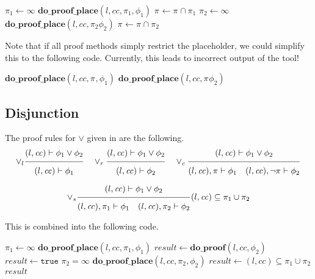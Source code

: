 \documentclass{article}
\newcommand{\proofrule}[3][]{#1 \frac{\raisebox{.7ex}{\normalsize{$#2$}}}
  {\raisebox{-1.0ex}{\normalsize{$#3$}}}}
\newcommand{\placeholder}[1][]{\pi_{#1}}
\newcommand{\loc}{l}
\newcommand{\region}{\mathit{cc}}
\newcommand{\var}[1]{\ensuremath{\mathit{#1}}}
\newcommand{\method}[1]{\ensuremath{\mathbf{#1}}}
\newcommand{\true}{\texttt{true}}
\begin{document}
\begin{algorithm}[H]
\caption{$\method{do\_proof\_place\_and}(\loc, \region, \placeholder, \phi_1 \land \phi_2)$}
\begin{algorithmic}
\STATE $\placeholder[1] \gets \infty$
\STATE $\method{do\_proof\_place}(\loc, \region, \placeholder[1], \phi_1)$
\STATE $\placeholder \gets \placeholder \cap \placeholder[1]$
\IF{$\placeholder = \emptyset$}
  \STATE $\placeholder[2] \gets \infty$
  \STATE $\method{do\_proof\_place}(\loc, \region, \placeholder[2] \phi_2)$
  \STATE $\placeholder \gets \placeholder \cap \placeholder[2]$
\ENDIF
\end{algorithmic}
\end{algorithm}
Note that if all proof methods simply restrict the placeholder, we could simplify this to the following code.
Currently, this leads to incorrect output of the tool!
\begin{algorithm}[H]
\caption{$\method{do\_proof\_place\_and}(\loc, \region, \placeholder, \phi_1 \land \phi_2)$}
\begin{algorithmic}
\STATE $\method{do\_proof\_place}(\loc, \region, \placeholder, \phi_1)$
\IF{$\placeholder = \emptyset$}
  \STATE $\method{do\_proof\_place}(\loc, \region, \placeholder \phi_2)$
\ENDIF
\end{algorithmic}
\end{algorithm}

\subsection{Disjunction}
The proof rules for $\lor$ given in \cite{FC:14} are the following.
\[
\proofrule[\lor_l]
{(\loc, \region) \vdash \phi_1 \lor \phi_2}
{(\loc, \region) \vdash \phi_1}
%
\quad
\proofrule[\lor_r]
{(\loc, \region) \vdash \phi_1 \lor \phi_2}
{(\loc, \region) \vdash \phi_2}
\quad
\proofrule[\lor_c]
{(\loc, \region) \vdash \phi_1 \lor \phi_2}
{(\loc, \region), \placeholder \vdash \phi_1
\quad
(\loc, \region), \lnot \placeholder \vdash \phi_2
}
\]

\[
\proofrule[\lor_s]
{(\loc, \region) \vdash \phi_1 \lor \phi_2}
{(\loc, \region), \placeholder[1] \vdash \phi_1
\quad (\loc, \region), \placeholder[2] \vdash \phi_2}
(\loc, \region) \subseteq \placeholder[1] \cup \placeholder[2]
\]

This is combined into the following code.
\begin{algorithm}[H]
\caption{$\method{do\_proof\_or}(\loc, \region, \phi_1 \lor \phi_2)$}
\begin{algorithmic}
\STATE $\placeholder[1] \gets \infty$
\STATE $\method{do\_proof\_place}(\loc, \region, \placeholder[1], \phi_1)$
\IF[Rule $\lor_r$]{$\placeholder[1] = \emptyset$}
  \STATE $\var{result} \gets \method{do\_proof}(\loc, \region, \phi_2)$
\ELSIF[Rule $\lor_l$]{$(\loc, \region) \subseteq \placeholder[1]$}
   \STATE $\var{result} \gets \true$
  \STATE $\placeholder[2] = \infty$
  \STATE $\method{do\_proof\_place}(\loc, \region, \placeholder[2], \phi_2)$
  \STATE $\var{result} \gets (l,cc) \subseteq \placeholder[1] \cup \placeholder[2]$
\ENDIF
\RETURN \var{result}
\end{algorithmic}
\end{algorithm}
\end{document}
